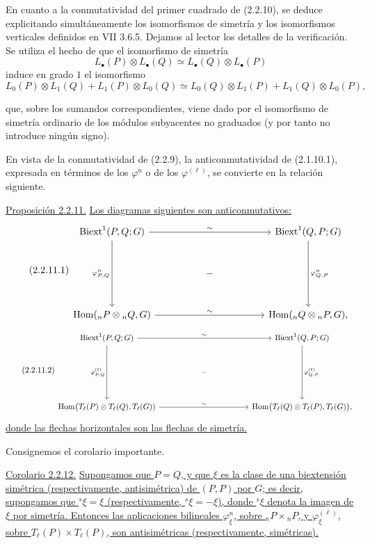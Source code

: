 En cuanto a la conmutatividad del primer cuadrado de (2.2.10), se
deduce explicitando simultáneamente los isomorfismos de simetría y los
isomorfismos verticales definidos en VII 3.6.5. Dejamos al lector los
detalles de la verificación. Se utiliza el hecho de que el
isomorfismo de simetría
\[
 L_\bullet(P)\otimes L_\bullet(Q)
 \simeq
 L_\bullet(Q)\otimes L_\bullet(P)
\]
induce en grado $1$ el isomorfismo
\[
 L_0(P)\otimes L_1(Q)+L_1(P)\otimes L_0(Q)
 \simeq
 L_0(Q)\otimes L_1(P)+L_1(Q)\otimes L_0(P),
\]


que, sobre los sumandos correspondientes, viene dado por el
isomorfismo de simetría ordinario de los módulos subyacentes no
graduados (y por tanto no introduce ningún signo).

En vista de la conmutatividad de (2.2.9), la anticonmutatividad de
(2.1.10.1), expresada en términos de los $\varphi^n$ o de los
$\varphi^{(\ell)}$, se convierte en la relación siguiente.

\medskip
\noindent\underline{Proposición 2.2.11.}
\underline{Los diagramas siguientes son anticonmutativos:}
\begin{equation}\tag{2.2.11.1}
\begin{tikzcd}[row sep=large,column sep=huge]
 \Biext^1(P,Q;G)
   \arrow[rr,"\sim"]
   \arrow[dd,"{\varphi^n_{P,Q}}"']&&
 \Biext^1(Q,P;G)
   \arrow[dd,"{\varphi^n_{Q,P}}"]\\
 &- &\\
 \Hom({}_nP\otimes{}_nQ,G)
   \arrow[rr,"\sim"]&&
 \Hom({}_nQ\otimes{}_nP,G),
\end{tikzcd}
\end{equation}
\begin{equation}\tag{2.2.11.2}
\begin{tikzcd}[row sep=large,column sep=huge]
 \Biext^1(P,Q;G)
   \arrow[rr,"\sim"]
   \arrow[dd,"{\varphi^{(\ell)}_{P,Q}}"']&&
 \Biext^1(Q,P;G)
   \arrow[dd,"{\varphi^{(\ell)}_{Q,P}}"]\\
 &- &\\
 \Hom\bigl(T_\ell(P)\otimes T_\ell(Q),T_\ell(G)\sisi{}{)}
   \arrow[rr,"\sim"]&&
 \Hom\bigl(T_\ell(Q)\otimes T_\ell(P),T_\ell(G)\bigr),
\end{tikzcd}
\end{equation}
\underline{donde las flechas horizontales son las flechas de simetría.}

Consignemos el corolario importante.

\medskip
\begingroup
\sloppy
\noindent\underline{Corolario 2.2.12.}
\uline{Supongamos que $P=Q$, y que $\xi$ es la clase de una
biextensión simétrica (respectivamente, antisimétrica) de $(P,P)$ por
$G$; es decir, supongamos que ${}^s\xi=\xi$ (respectivamente,
${}^s\xi=-\xi$), donde ${}^s\xi$ denota la imagen de $\xi$ por
simetría. Entonces las aplicaciones bilineales $\varphi^n_\xi$, sobre
${}_nP\times{}_nP$, y $\varphi^{(\ell)}_\xi$, sobre
$T_\ell(P)\times T_\ell(P)$, son antisimétricas (respectivamente,
simétricas).}
\par
\endgroup


